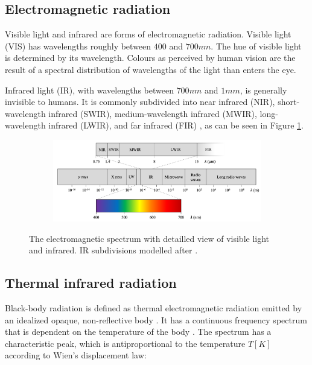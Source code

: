 \documentclass{l4proj}
\begin{document}
\subsection{Electromagnetic radiation}

Visible light and infrared are forms of electromagnetic radiation. Visible light (VIS) has wavelengths roughly between $400$ and $700 nm$. The hue of visible light is determined by its wavelength. Colours as perceived by human vision are the result of a spectral distribution of wavelengths of the light than enters the eye. 

Infrared light (IR), with wavelengths between $700 nm$ and $1 mm$, is generally invisible to humans. It is commonly subdivided into near infrared (NIR), short-wavelength infrared (SWIR), medium-wavelength infrared (MWIR), long-wavelength infrared (LWIR), and far infrared (FIR) \citep[p. 28]{byrnes_unexploded_2008}, as can be seen in Figure \ref{fig:em_spectrum}.

\begin{figure}[ht]
  \centering
  \begin{subfigure}[h!]{0.9\textwidth}
    \includegraphics[width=\textwidth]{images/EM_spectrum.png}
  \end{subfigure}
  \caption{The electromagnetic spectrum with detailled view of visible light and infrared. IR subdivisions modelled after \citet[p. 28]{byrnes_unexploded_2008}.}
  \label{fig:em_spectrum}
\end{figure}

\subsection{Thermal infrared radiation}

Black-body radiation is defined as thermal electromagnetic radiation emitted by an idealized opaque, non-reflective body \citep{young_sears_2012}. It has a continuous frequency spectrum that is dependent on the temperature of the body \citep{kogure_thermodynamic_2007}. The spectrum has a characteristic peak, which is antiproportional to the temperature $T [K]$ according to Wien's displacement law:
\end{document}
